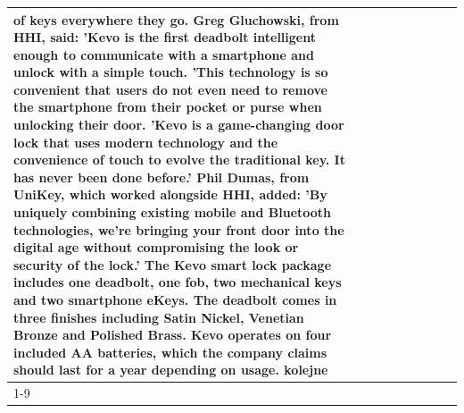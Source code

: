 \begin{table}[H]
\begin{tabular}{lllrlllll}
of keys everywhere they go. Greg Gluchowski, from HHI, said: 'Kevo is the first deadbolt intelligent enough to communicate with a smartphone and unlock with a simple touch. 'This technology is so convenient that users do not even need to remove the smartphone from their pocket or purse when unlocking their door. 'Kevo is a game-changing door lock that uses modern technology and the convenience of touch to evolve the traditional key. It has never been done before.' Phil Dumas, from UniKey, which worked alongside HHI, added: 'By uniquely combining existing mobile and Bluetooth technologies, we’re bringing your front door into the digital age without compromising the look or security of the lock.' The Kevo smart lock package includes one deadbolt, one fob, two mechanical keys and two smartphone eKeys. The deadbolt comes in three finishes including Satin Nickel, Venetian Bronze and Polished Brass. Kevo operates on four included AA batteries, which the company claims should last for a year depending on usage. kolejne \\
\cline{1-9}

\end{tabular}
\end{table}
